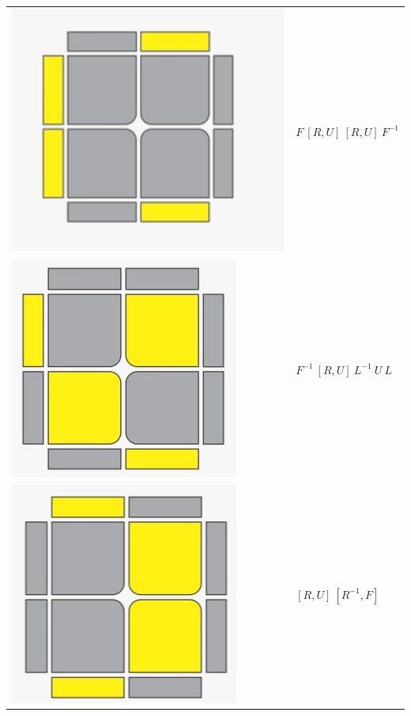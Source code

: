 \documentclass[12pt,a4paper]{article}
\theoremstyle{custom}
\begin{document}
\begin{center}
\begin{tabular}{m{4cm} m{6cm}}
\includegraphics[scale=0.17]{images/Upside-3.png} & $F \ [ R,U ] \  [ R,U ] \ F^{-1}$ \\
\includegraphics[scale=0.4]{images/Upside-4.png} & $F^{-1} \ [ R,U ]\ L^{-1} \ U \ L$ \\
\includegraphics[scale=0.4]{images/Upside-5.png} & $[ R,U ] \ [R^{-1}, F]$ \\

\end{tabular}
\end{center}
\end{document}
